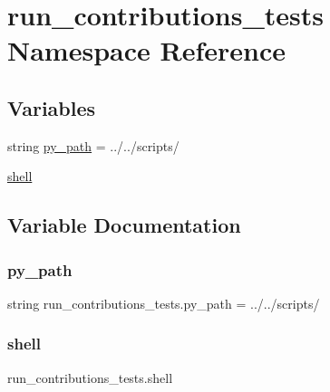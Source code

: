 \hypertarget{namespacerun__contributions__tests}{}\section{run\+\_\+contributions\+\_\+tests Namespace Reference}
\label{namespacerun__contributions__tests}
\subsection*{Variables}
\begin{DoxyCompactItemize}
\item 
string \hyperlink{namespacerun__contributions__tests_af214b93912300e15a98dcb741a820775}{py\+\_\+path} = \textquotesingle{}../../scripts/\textquotesingle{}
\item 
\hyperlink{namespacerun__contributions__tests_a712d7d682332301753e46480879dfa9e}{shell}
\end{DoxyCompactItemize}


\subsection{Variable Documentation}
\mbox{\label{namespacerun__contributions__tests_af214b93912300e15a98dcb741a820775}} 
\subsubsection{\texorpdfstring{py\+\_\+path}{py\_path}}
{\footnotesize\ttfamily string run\+\_\+contributions\+\_\+tests.\+py\+\_\+path = \textquotesingle{}../../scripts/\textquotesingle{}}

\mbox{\label{namespacerun__contributions__tests_a712d7d682332301753e46480879dfa9e}} 
\subsubsection{\texorpdfstring{shell}{shell}}
{\footnotesize\ttfamily run\+\_\+contributions\+\_\+tests.\+shell}


